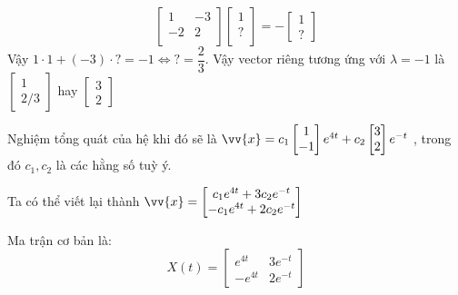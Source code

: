 \documentclass[a4paper]{article}
\begin{document}
\begin{equation*}
    \begin{bmatrix}
        1  & -3 \\
        -2 & 2 \\
    \end{bmatrix}
    \begin{bmatrix}
        1 \\ 
        ? \\ 
    \end{bmatrix}
    = -
    \begin{bmatrix}
        1 \\
        ? 
    \end{bmatrix}
\end{equation*}
Vậy $ 1\cdot1 + (-3) \cdot ? = -1 \iff ? = \dfrac{2}{3}$. Vậy vector riêng tương ứng với $\lambda = -1$ là 
$
\begin{bmatrix}
    1 \\ 2/3 
\end{bmatrix}
$
hay
$
\begin{bmatrix}
    3 \\ 2
\end{bmatrix}
$

Nghiệm tổng quát của hệ khi đó sẽ là 
$
\vv{x} = c_1
\begin{bmatrix}
    1 \\ -1
\end{bmatrix}
e^{4t} + c_2 
\begin{bmatrix}
    3 \\ 2
\end{bmatrix}
e^{-t}
$
, trong đó $c_1, c_2$ là các hằng số tuỳ ý. \par
Ta có thể viết lại thành 
$
\vv{x} = 
\begin{bmatrix}
    c_1e^{4t} + 3c_2e^{-t} \\
    -c_1e^{4t} + 2c_2e^{-t}
\end{bmatrix}
$ \par
Ma trận cơ bản là: 
\[
    X(t) = 
    \begin{bmatrix}
        e^{4t} & 3e^{-t} \\
        -e^{4t} & 2e^{-t}
    \end{bmatrix}
\]
\end{document}
